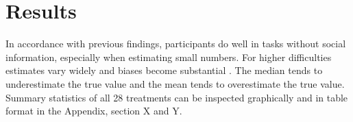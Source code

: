 \documentclass[9pt,twocolumn,twoside,lineno]{pnas-new}
\begin{document}
\section*{Results}
In accordance with previous findings, participants do well in tasks without social information, especially when estimating small numbers. For higher difficulties estimates vary widely and biases become substantial \cite{indow1977scaling, izard2008calibrating, krueger1982single, krueger1984perceived, kao2018counteracting}. The median tends to underestimate the true value and the mean tends to overestimate the true value. Summary statistics of all 28 treatments can be inspected graphically and in table format in the Appendix, section X and Y.



\end{document}
